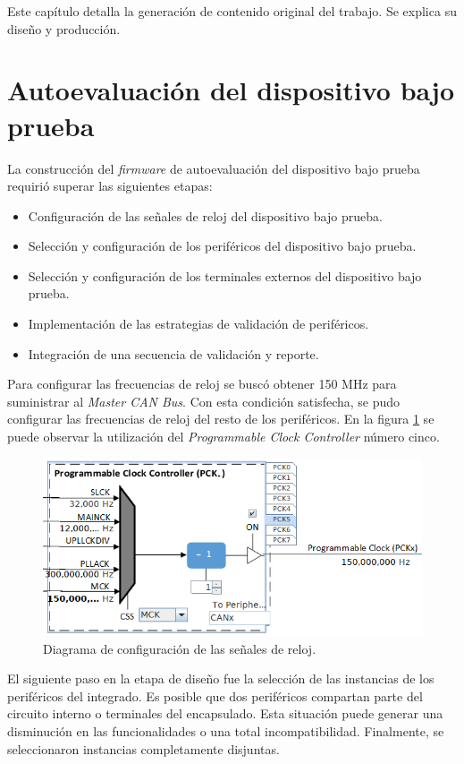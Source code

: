 Este capítulo detalla la generación de contenido original del trabajo.
Se explica su diseño y producción.

\section{Autoevaluación del dispositivo bajo prueba}
\label{sec:autoevaluacion}

La construcción del \emph{firmware} de autoevaluación del dispositivo bajo prueba requirió superar las siguientes etapas:
\begin{itemize}
    \item Configuración de las señales de reloj del dispositivo bajo prueba.
    \item Selección y configuración de los periféricos del dispositivo bajo prueba.
    \item Selección y configuración de los terminales externos del dispositivo bajo prueba.
    \item Implementación de las estrategias de validación de periféricos.
    \item Integración de una secuencia de validación y reporte.
\end{itemize}

Para configurar las frecuencias de reloj se buscó obtener 150 MHz para suministrar al \emph{Master CAN Bus}.
Con esta condición satisfecha, se pudo configurar las frecuencias de reloj del resto de los periféricos.
En la figura \ref{fig:clock} se puede observar la utilización del \emph{Programmable Clock Controller} número cinco.

\begin{figure}[htbp]
	\centering
	\includegraphics[width=\textwidth]{./Figures/Clock.png}
    \caption{Diagrama de configuración de las señales de reloj.}
	\label{fig:clock}
\end{figure}

El siguiente paso en la etapa de diseño fue la selección de las instancias de los periféricos del integrado.
Es posible que dos periféricos compartan parte del circuito interno o terminales del encapsulado.
Esta situación puede generar una disminución en las funcionalidades o una total incompatibilidad.
Finalmente, se seleccionaron instancias completamente disjuntas.

